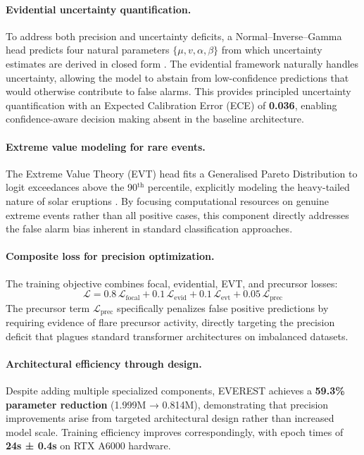 \paragraph{Evidential uncertainty quantification.}
To address both precision and uncertainty deficits, a Normal–Inverse–Gamma head predicts four natural parameters $\{\mu,v,\alpha,\beta\}$ from which uncertainty estimates are derived in closed form \citep{sensoy2018evidential}. The evidential framework naturally handles uncertainty, allowing the model to abstain from low-confidence predictions that would otherwise contribute to false alarms. This provides principled uncertainty quantification with an Expected Calibration Error (ECE) of \textbf{0.036}, enabling confidence-aware decision making absent in the baseline architecture.

\paragraph{Extreme value modeling for rare events.}
The Extreme Value Theory (EVT) head fits a Generalised Pareto Distribution to logit exceedances above the 90$^{\text{th}}$ percentile, explicitly modeling the heavy-tailed nature of solar eruptions \citep{coles2001extremes}. By focusing computational resources on genuine extreme events rather than all positive cases, this component directly addresses the false alarm bias inherent in standard classification approaches.

\paragraph{Composite loss for precision optimization.}
The training objective combines focal, evidential, EVT, and precursor losses:
\[
  \mathcal{L}=0.8\,\mathcal{L}_{\text{focal}}
             +0.1\,\mathcal{L}_{\text{evid}}
             +0.1\,\mathcal{L}_{\text{evt}}
             +0.05\,\mathcal{L}_{\text{prec}}
\]
The precursor term $\mathcal{L}_{\text{prec}}$ specifically penalizes false positive predictions by requiring evidence of flare precursor activity, directly targeting the precision deficit that plagues standard transformer architectures on imbalanced datasets.

\paragraph{Architectural efficiency through design.}
Despite adding multiple specialized components, \textsc{EVEREST} achieves a \textbf{59.3\% parameter reduction} (1.999M → 0.814M), demonstrating that precision improvements arise from targeted architectural design rather than increased model scale. Training efficiency improves correspondingly, with epoch times of \textbf{24s ± 0.4s} on RTX A6000 hardware.

